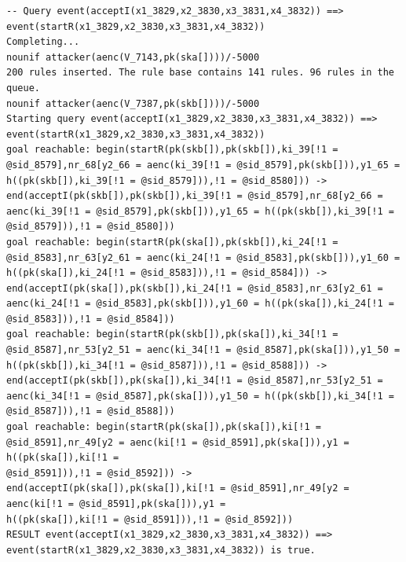 \documentclass[10pt,a4paper]{article}
\begin{document}
\begin{Verbatim}[fontsize=\scriptsize]
-- Query event(acceptI(x1_3829,x2_3830,x3_3831,x4_3832)) ==> event(startR(x1_3829,x2_3830,x3_3831,x4_3832))
Completing...
nounif attacker(aenc(V_7143,pk(ska[])))/-5000
200 rules inserted. The rule base contains 141 rules. 96 rules in the queue.
nounif attacker(aenc(V_7387,pk(skb[])))/-5000
Starting query event(acceptI(x1_3829,x2_3830,x3_3831,x4_3832)) ==> event(startR(x1_3829,x2_3830,x3_3831,x4_3832))
goal reachable: begin(startR(pk(skb[]),pk(skb[]),ki_39[!1 = @sid_8579],nr_68[y2_66 = aenc(ki_39[!1 = @sid_8579],pk(skb[])),y1_65 =
h((pk(skb[]),ki_39[!1 = @sid_8579])),!1 = @sid_8580])) -> end(acceptI(pk(skb[]),pk(skb[]),ki_39[!1 = @sid_8579],nr_68[y2_66 =
aenc(ki_39[!1 = @sid_8579],pk(skb[])),y1_65 = h((pk(skb[]),ki_39[!1 = @sid_8579])),!1 = @sid_8580]))
goal reachable: begin(startR(pk(ska[]),pk(skb[]),ki_24[!1 = @sid_8583],nr_63[y2_61 = aenc(ki_24[!1 = @sid_8583],pk(skb[])),y1_60 =
h((pk(ska[]),ki_24[!1 = @sid_8583])),!1 = @sid_8584])) -> end(acceptI(pk(ska[]),pk(skb[]),ki_24[!1 = @sid_8583],nr_63[y2_61 =
aenc(ki_24[!1 = @sid_8583],pk(skb[])),y1_60 = h((pk(ska[]),ki_24[!1 = @sid_8583])),!1 = @sid_8584]))
goal reachable: begin(startR(pk(skb[]),pk(ska[]),ki_34[!1 = @sid_8587],nr_53[y2_51 = aenc(ki_34[!1 = @sid_8587],pk(ska[])),y1_50 =
h((pk(skb[]),ki_34[!1 = @sid_8587])),!1 = @sid_8588])) -> end(acceptI(pk(skb[]),pk(ska[]),ki_34[!1 = @sid_8587],nr_53[y2_51 =
aenc(ki_34[!1 = @sid_8587],pk(ska[])),y1_50 = h((pk(skb[]),ki_34[!1 = @sid_8587])),!1 = @sid_8588]))
goal reachable: begin(startR(pk(ska[]),pk(ska[]),ki[!1 = @sid_8591],nr_49[y2 = aenc(ki[!1 = @sid_8591],pk(ska[])),y1 = h((pk(ska[]),ki[!1 =
@sid_8591])),!1 = @sid_8592])) -> end(acceptI(pk(ska[]),pk(ska[]),ki[!1 = @sid_8591],nr_49[y2 = aenc(ki[!1 = @sid_8591],pk(ska[])),y1 =
h((pk(ska[]),ki[!1 = @sid_8591])),!1 = @sid_8592]))
RESULT event(acceptI(x1_3829,x2_3830,x3_3831,x4_3832)) ==> event(startR(x1_3829,x2_3830,x3_3831,x4_3832)) is true.
\end{Verbatim}
\end{document}
